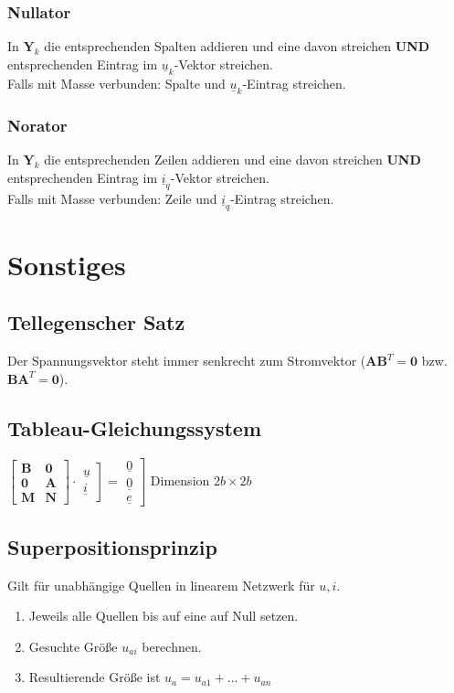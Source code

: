 \documentclass[a4paper,twocolumn,10pt]{article}
\begin{document}
\subsubsection*{Nullator}
In $\textbf{Y}_k$ die entsprechenden Spalten addieren und eine davon streichen \textbf{UND} entsprechenden Eintrag im $\underline{u}_k$-Vektor streichen.\\
Falls mit Masse verbunden: Spalte und $\underline{u}_k$-Eintrag streichen.
\subsubsection*{Norator}
In $\textbf{Y}_k$ die entsprechenden Zeilen addieren und eine davon streichen \textbf{UND} entsprechenden Eintrag im $\underline{i}_q$-Vektor streichen.\\
Falls mit Masse verbunden: Zeile und $\underline{i}_q$-Eintrag streichen.

\section*{Sonstiges}
\subsection*{Tellegenscher Satz}
Der Spannungsvektor steht immer senkrecht zum Stromvektor ($\textbf{A}\textbf{B}^T=\textbf{0}$ bzw. $\textbf{B}\textbf{A}^T=\textbf{0}$).

\subsection*{Tableau-Gleichungssystem}
$\begin{bmatrix}\textbf{B} & \textbf{0} \\ \textbf{0} & \textbf{A} \\ \textbf{M} & \textbf{N}\end{bmatrix}\cdot \left.\begin{matrix}\underline{u}\\\underline{i}\end{matrix}\right]=\left.\begin{matrix}\underline{0}\\ \underline{0} \\ \underline{e}\end{matrix}\right]$
Dimension $2b\times 2b$

\subsection*{Superpositionsprinzip}
Gilt für unabhängige Quellen in linearem Netzwerk für $u,i$.
\begin{enumerate}
	\item Jeweils alle Quellen bis auf eine auf Null setzen.
	\item Gesuchte Größe $u_{ai}$ berechnen.
	\item Resultierende Größe ist $u_a=u_{a1}+...+u_{an}$
	
\end{enumerate}
\end{document}
